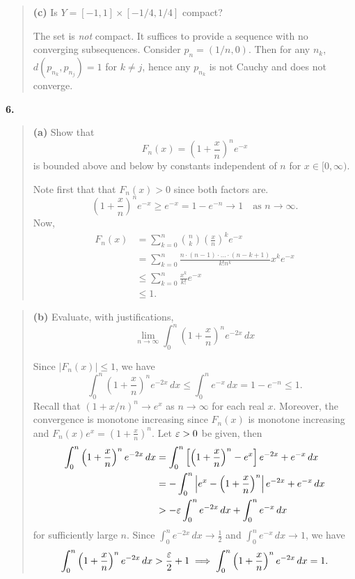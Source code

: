 \documentclass{homework}
\begin{document}
\begin{quote}
  {\bf (c)} Is $Y = [-1,1] \times [-1/4,1/4]$ compact?
  \begin{solution}
    The set is \emph{not} compact. It suffices to provide a sequence with no converging subsequences.  Consider $p_n = (1/n,0)$.  Then for any $n_k$, $d(p_{n_k},p_{n_j}) = 1$ for $k\not=j$, hence any $p_{n_k}$ is not Cauchy and does not converge.
  \end{solution}
\end{quote}

{\bf 6.}
\begin{quote}
  {\bf (a)} Show that 
  $$
    F_n(x) = \left(1 + \frac xn\right)^n e^{-x}
  $$
  is bounded above and below by constants independent of $n$ for $x\in[0,\infty)$.
  \begin{solution}
  Note first that that $F_n(x) > 0$ since both factors are.  
    $$
      \left(1 + \frac xn\right)^n e^{-x}
      \ge e^{-x} = 1 - e^{-n} \to 1\quad\text{as }n\to\infty.
    $$
  Now,
  \begin{align*}
    F_n(x) 
    &= \sum_{k=0}^n\binom nk \left( \frac xn \right)^k e^{-x}\\
    &= \sum_{k=0}^n \frac{n\cdot(n-1)\cdot\dots\cdot(n-k+1)}{k!n^k}x^k e^{-x}\\
    &\le \sum_{k=0}^n \frac{x^k}{k!} e^{-x}\\
    &\le 1.
  \end{align*}
  \end{solution}
\end{quote}
\begin{quote}
  {\bf (b)} Evaluate, with justifications,
  $$
    \lim_{n\to\infty}\int_0^n \left(1 + \frac xn\right)^n e^{-2x}\,dx
  $$
  \begin{solution}
    Since $|F_n(x)| \le 1$, we have 
    $$
      \int_0^n \left(1 + \frac xn\right)^n e^{-2x}\,dx 
      \le \int_0^n e^{-x}\,dx = 1 - e^{-n} \le 1.
    $$
    Recall that $(1+x/n)^n \to e^x$ as $n\to\infty$ for each real $x$.  Moreover, the convergence is monotone increasing since $F_n(x)$ is monotone increasing and $F_n(x)e^{x} = \left(1 + \frac xn\right)^n$.  Let $\varepsilon > 0$ be given, then
    \begin{align*}
      \int_0^n \left(1 + \frac xn\right)^n e^{-2x}\,dx 
      &= \int_0^n \left[\left(1 + \frac xn\right)^n - e^x\right] e^{-2x} + e^{-x}\,dx \\
      &= -\int_0^n \left|e^x - \left(1 + \frac xn\right)^n\right| e^{-2x} + e^{-x}\,dx \\
      &> -\varepsilon\int_0^n e^{-2x}\,dx + \int_0^ne^{-x}\,dx
    \end{align*}
    for sufficiently large $n$.  Since $\int_0^n e^{-2x}\,dx \to \frac 12$ and $\int_0^n e^{-x}\,dx \to 1$, we have
    $$
      \int_0^n \left(1 + \frac xn\right)^n e^{-2x}\,dx > \frac{\varepsilon}2 + 1
      \implies
      \int_0^n \left(1 + \frac xn\right)^n e^{-2x}\,dx = 1.
    $$
  \end{solution}
\end{quote}
\end{document}
